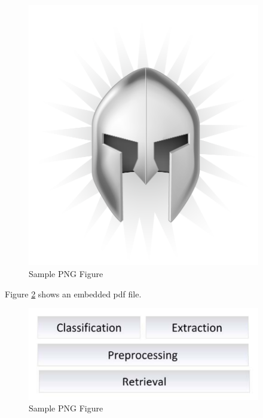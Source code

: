 \begin{figure}
\centering
\includegraphics[width=4in]{pngFigure.png}
\caption{Sample PNG Figure}
\label{fig:samplePng}
\end{figure}

Figure \ref{fig:samplePdf} shows an embedded pdf file.
 
\begin{figure}
\centering
\includegraphics[width=4in]{pdfFigure.pdf}
\caption{Sample PNG Figure}
\label{fig:samplePdf}
\end{figure}